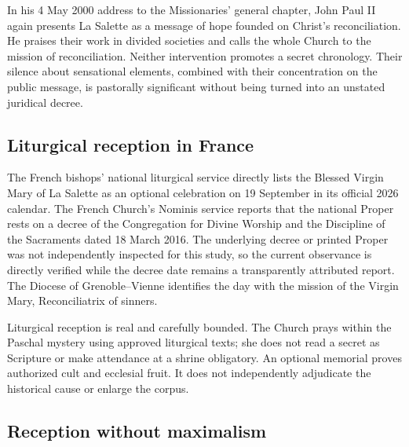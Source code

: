 In his 4 May 2000 address to the Missionaries' general chapter, John Paul II again presents La Salette as a message of hope founded on Christ's reconciliation. He praises their work in divided societies and calls the whole Church to the mission of reconciliation. Neither intervention promotes a secret chronology. Their silence about sensational elements, combined with their concentration on the public message, is pastorally significant without being turned into an unstated juridical decree.

\subsection{Liturgical reception in France}

The French bishops' national liturgical service directly lists the Blessed Virgin Mary of La Salette as an optional celebration on 19 September in its official 2026 calendar. The French Church's Nominis service reports that the national Proper rests on a decree of the Congregation for Divine Worship and the Discipline of the Sacraments dated 18 March 2016. The underlying decree or printed Proper was not independently inspected for this study, so the current observance is directly verified while the decree date remains a transparently attributed report. The Diocese of Grenoble--Vienne identifies the day with the mission of the Virgin Mary, Reconciliatrix of sinners.

Liturgical reception is real and carefully bounded. The Church prays within the Paschal mystery using approved liturgical texts; she does not read a secret as Scripture or make attendance at a shrine obligatory. An optional memorial proves authorized cult and ecclesial fruit. It does not independently adjudicate the historical cause or enlarge the corpus.

\subsection{Reception without maximalism}


